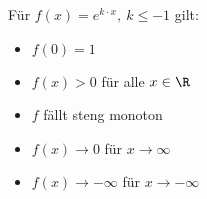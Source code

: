 \documentclass[9pt, a4paper, landscape, twocolumn]{scrartcl}
\begin{document}
    Für $f(x)=e^{k\cdot x},\ k \leq -1$ gilt:
    \begin{multicols}{2}
        
        \columnbreak
        
        \begin{itemize}\itemsep 0pt
            \item $f(0)=1$
            \item $f(x)>0$ für alle $x\in \R$
            \item $f$ fällt steng monoton
            \item $f(x)\to 0$ für $x\to \infty$
            \item $f(x)\to -\infty$ für $x\to -\infty$
        \end{itemize}
    \end{multicols}
    
\end{document}
